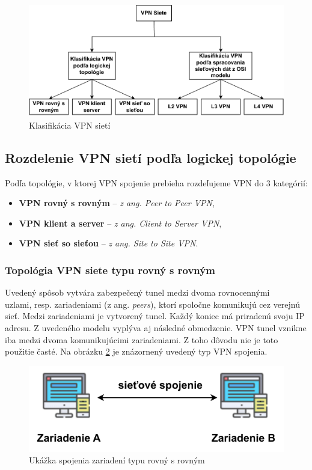 \begin{figure}[!ht]
	\centering
	\includegraphics[width=\textwidth]{figures/vpnklas}
	\caption{Klasifikácia VPN sietí}
	\label{vpnklas}
\end{figure}
  
\subsection{Rozdelenie VPN sietí podľa logickej topológie}
 Podľa topológie, v ktorej VPN spojenie prebieha rozdeľujeme VPN do 3 kategórií: 
\begin{itemize}
	\item \textbf{VPN rovný s rovným} -- \textit{z ang. Peer to Peer VPN},
	\item \textbf{VPN klient a server} -- \textit{z ang. Client to Server VPN}, 
	\item \textbf{VPN sieť so sieťou} -- \textit{z ang. Site to Site VPN}.
\end{itemize}

\subsubsection{Topológia VPN siete typu rovný s rovným}
Uvedený spôsob vytvára zabezpečený tunel medzi dvoma rovnocennými \\uzlami, resp. zariadeniami (z ang. \textit{peers}), ktorí spoločne komunikujú cez verejnú sieť. Medzi zariadeniami je vytvorený tunel. Každý koniec má priradenú svoju IP adresu. Z uvedeného modelu vyplýva aj následné obmedzenie. VPN tunel vznikne iba medzi dvoma komunikujúcimi zariadeniami. Z toho dôvodu nie je toto použitie časté. Na obrázku \ref{p2p} je znázornený uvedený typ VPN spojenia. 
\begin{figure}[!ht]
	\centering
	\includegraphics[width=.7\textwidth]{figures/p2p}
	\caption{Ukážka spojenia zariadení typu rovný s rovným}
	\label{p2p}
\end{figure}
 
